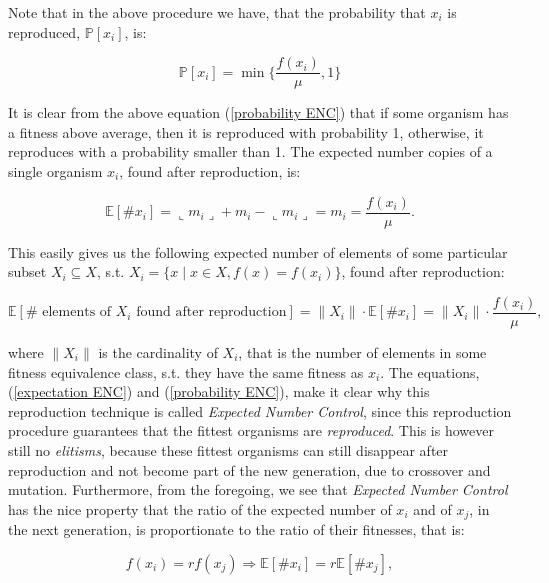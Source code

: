 \documentclass[a4paper]{article}
\newcommand{\fl}{\llcorner}
\newcommand{\fr}{\lrcorner}
\newcommand{\Prob}[1]{\mathbb{P}[#1]}
\newcommand{\Expec}[1]{\mathbb{E}[#1]}
\theoremstyle{dotless}
\begin{document}
Note that in the above procedure we have, that the probability that $x_i$ is reproduced, $\Prob{x_i}$, is:

\begin{equation}\label{probability ENC}
\Prob{x_i} = \min \{ \dfrac{f(x_i)}{\mu}, 1 \}
\end{equation}

It is clear from the above equation (\ref{probability ENC}) that if some organism has a fitness above average, then it is reproduced with probability 1, otherwise, it reproduces with a probability smaller than 1. The expected number copies of a single organism $x_i$, found after reproduction, is:

\begin{equation}\label{expectation ENC}
\Expec{\# x_i} = \fl m_i \fr + m_i - \fl m_i \fr = m_i = \dfrac{f(x_i)}{\mu}.
\end{equation}

This easily gives us the following expected number of elements of some particular subset $X_i \subseteq X$, s.t. $X_i = \{ x \mid x \in X, f(x) = f(x_i) \}$, found after reproduction:

\begin{equation}
\Expec{ \# \text{ elements of } X_i \text{ found after reproduction}} = \| X_i \| \cdot \Expec{\# x_i} = \| X_i \| \cdot \dfrac{f(x_i)}{\mu},
\end{equation}

where $\| X_i \|$ is the cardinality of $X_i$, that is the number of elements in some fitness equivalence class, s.t. they  have the same fitness as $x_i$. The equations, (\ref{expectation ENC}) and (\ref{probability ENC}), make it clear why this reproduction technique is called \emph{Expected Number Control}, since this reproduction procedure guarantees that the fittest organisms are \emph{reproduced}. This is however still no \emph{elitisms}, because these fittest organisms can still disappear after reproduction and not become part of the new generation, due to crossover and mutation. Furthermore, from the foregoing, we see that \emph{Expected Number Control} has the nice property that the ratio of the expected number of $x_i$ and of $x_j$, in the next generation, is proportionate to the ratio of their fitnesses, that is:

\begin{equation}\label{Property ENC}
f(x_i) = r f(x_j) \Rightarrow \Expec{ \# x_i } = r \Expec{ \# x_j },
\end{equation}
\end{document}
